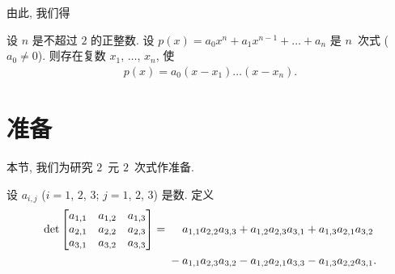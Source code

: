 \documentclass[../libro.tex]{subfiles}
\begin{document}
由此, 我们得

\begin{theorem}
    设 \(n\) 是不超过 \(2\) 的正整数.
    设 \(p(x) = a_0 x^n + a_1 x^{n-1} + \dots + a_n\)
    是 \(n\)~次式
    (\(a_0 \neq 0\)).
    则存在复数 \(x_1\), \(\dots\), \(x_n\),
    使
    \begin{align*}
        p(x) = a_0 (x - x_1) \dots (x - x_n).
    \end{align*}
\end{theorem}





\section{准备}

本节, 我们为研究 \(2\)~元 \(2\)~次式作准备.

\begin{definition}
    设 \(a_{i,j}\)
    (\(i = 1\), \(2\), \(3\);
    \(j = 1\), \(2\), \(3\)) 是数.
    定义
    \begin{align*}
        \tridet \det
        \begin{bmatrix}
            a_{1,1} & a_{1,2} & a_{1,3} \\
            a_{2,1} & a_{2,2} & a_{2,3} \\
            a_{3,1} & a_{3,2} & a_{3,3} \\
        \end{bmatrix} \tridet
        = {} &
        \hphantom{{} + {}}
        a_{1,1} a_{2,2} a_{3,3}
        + a_{1,2} a_{2,3} a_{3,1}
        + a_{1,3} a_{2,1} a_{3,2}
        \\
        &
        - a_{1,1} a_{2,3} a_{3,2}
        - a_{1,2} a_{2,1} a_{3,3}
        - a_{1,3} a_{2,2} a_{3,1}.
    \end{align*}
\end{definition}
\end{document}
